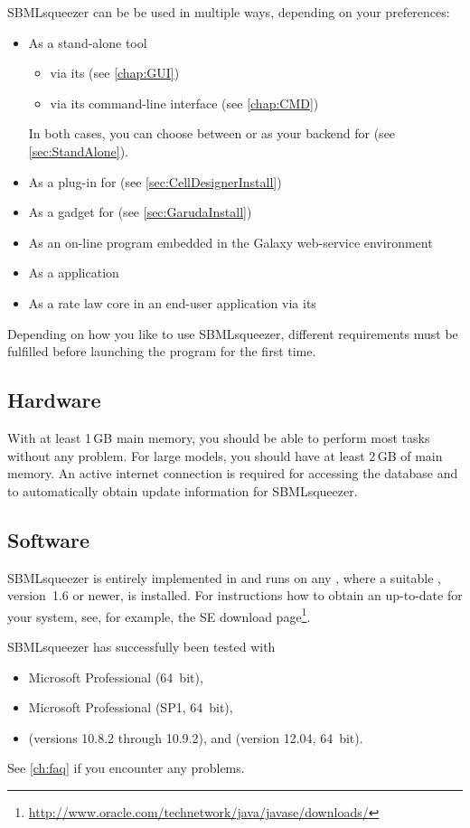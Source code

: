 SBMLsqueezer can be be used in multiple ways, depending on your preferences:
\begin{itemize}
  \item As a stand-alone tool
  \begin{itemize}
    \item via its \GUI (see \vref{chap:GUI})
    \item via its command-line interface (see \vref{chap:CMD})
  \end{itemize}
        In both cases, you can choose between \JSBML or \libSBML as your backend
        for \SBML (see \vref{sec:StandAlone}).
  \item As a plug-in for \CellDesigner (see \vref{sec:CellDesignerInstall})
  \item As a gadget for \Garuda (see \vref{sec:GarudaInstall})
  \item As an on-line program embedded in the Galaxy web-service environment
  \item As a \JavaWebStart application
  \item As a rate law core in an end-user application via its \API
\end{itemize}
Depending on how you like to use SBMLsqueezer, different requirements must be
fulfilled before launching the program for the first time.

\subsection{Hardware}

With at least 1\,GB main memory, you should be able to perform most tasks
without any problem. For large models, you should have at least 2\,GB of main
memory. An active internet connection is required for accessing the \SABIO
database and to automatically obtain update information for SBMLsqueezer.

\subsection{Software}\label{sec:SoftwareRequirements}

SBMLsqueezer is entirely implemented in \Java and runs on any \OS, where a 
suitable \JVM, \JDK version~1.6 or newer, is installed.
For instructions how to obtain an up-to-date \JVM for your system, see, for 
example, the \Java SE download
page\footnote{\url{http://www.oracle.com/technetwork/java/javase/downloads/}\label{fn:jvmldl}}.

SBMLsqueezer has successfully been tested with
\begin{itemize}
  \item Microsoft \WindowsSeven Professional (64~bit),
  \item Microsoft \WindowsSeven Professional (SP1, 64~bit),
  \item \MacOSX (versions 10.8.2 through 10.9.2), and \UbuntuLinux (version 12.04, 64~bit).
\end{itemize}
See \vref{ch:faq} if you encounter any problems.


